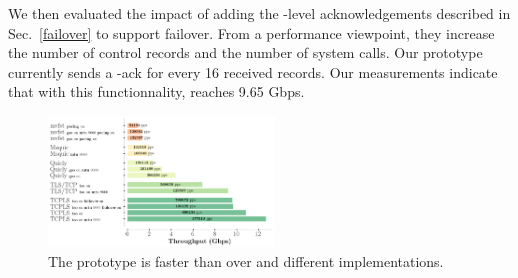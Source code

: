 
We then evaluated the impact of adding the \tcpls-level acknowledgements
described in Sec.~\ref{failover} to support failover.
From a performance viewpoint, they increase the number of control records and
the number of system calls. Our prototype currently sends a \tcpls-ack for every
16 received records. Our measurements indicate that with this functionnality,
\tcpls reaches 9.65 Gbps.


\begin{figure}[!t]
  \begin{center}
    \includegraphics[width=6cm]{figures/perf_analysis.png}
  \end{center}
\vspace{-0.5cm}
  \caption{The \tcpls prototype is faster than \tls over \tcp and different \quic implementations.}
  \label{fig:perf}
\end{figure}



